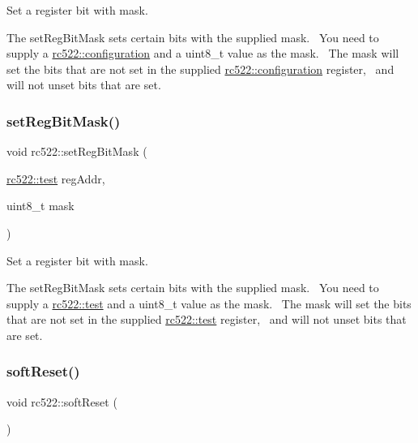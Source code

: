 Set a register bit with mask. 

The set\+Reg\+Bit\+Mask sets certain bits with the supplied mask.~\newline
You need to supply a \hyperlink{classrc522_afcf27c8198d017cd4e8173c7d7a6fded}{rc522\+::configuration} and a uint8\+\_\+t value as the mask.~\newline
The mask will set the bits that are not set in the supplied \hyperlink{classrc522_afcf27c8198d017cd4e8173c7d7a6fded}{rc522\+::configuration} register,~\newline
and will not unset bits that are set. \mbox{\label{classrc522_ac3752c747cd1cbb4510eaf24d363befe}} 
\subsubsection{\texorpdfstring{set\+Reg\+Bit\+Mask()}{setRegBitMask()}\hspace{0.1cm}{\footnotesize\ttfamily [4/4]}}
{\footnotesize\ttfamily void rc522\+::set\+Reg\+Bit\+Mask (\begin{DoxyParamCaption}\item[{\hyperlink{classrc522_a9589917c9bbcd18ea9c7d86c7ec565bd}{rc522\+::test}}]{reg\+Addr,  }\item[{uint8\+\_\+t}]{mask }\end{DoxyParamCaption})}



Set a register bit with mask. 

The set\+Reg\+Bit\+Mask sets certain bits with the supplied mask.~\newline
You need to supply a \hyperlink{classrc522_a9589917c9bbcd18ea9c7d86c7ec565bd}{rc522\+::test} and a uint8\+\_\+t value as the mask.~\newline
The mask will set the bits that are not set in the supplied \hyperlink{classrc522_a9589917c9bbcd18ea9c7d86c7ec565bd}{rc522\+::test} register,~\newline
and will not unset bits that are set. \mbox{\label{classrc522_a60bfe75989ff8f654d412d7802993a53}} 
\subsubsection{\texorpdfstring{soft\+Reset()}{softReset()}}
{\footnotesize\ttfamily void rc522\+::soft\+Reset (\begin{DoxyParamCaption}{ }\end{DoxyParamCaption})}




